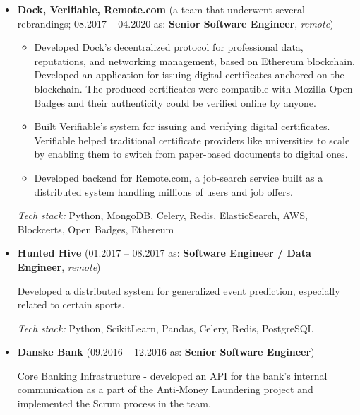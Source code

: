 \documentclass[12pt,a4paper]{article}
\begin{document}
\begin{itemize}[left=0pt]
  Developed a Spark-based company ETL system, provided technical mentorship, implemented best coding practices related to Python projects, co-implemented agile methodologies in the team.

  \textit{Tech stack:} Python, Apache Spark, Microsoft Azure, SQL Server.

  \item \textbf{Dock, Verifiable, Remote.com} (a team that underwent several rebrandings; 08.2017 -- 04.2020 as: \textbf{Senior Software Engineer}, \textit{remote})

  \begin{itemize}
    \item Developed Dock's decentralized protocol for professional data, reputations, and networking management, based on Ethereum blockchain. Developed an application for issuing digital certificates anchored on the blockchain. The produced certificates were compatible with Mozilla Open Badges and their authenticity could be verified online by anyone.

    \item Built Verifiable's system for issuing and verifying digital certificates. Verifiable helped traditional certificate providers like universities to scale by enabling them to switch from paper-based documents to digital ones.

    \item Developed backend for Remote.com, a job-search service built as a distributed system handling millions of users and job offers.
  \end{itemize}

  \textit{Tech stack:} Python, MongoDB, Celery, Redis, ElasticSearch, AWS, Blockcerts, Open Badges, Ethereum

  \item \textbf{Hunted Hive} (01.2017 -- 08.2017 as: \textbf{Software Engineer / Data Engineer}, \textit{remote})

  Developed a distributed system for generalized event prediction, especially related to certain sports.

  \textit{Tech stack:} Python, ScikitLearn, Pandas, Celery, Redis, PostgreSQL

  \item \textbf{Danske Bank} (09.2016 -- 12.2016 as: \textbf{Senior Software Engineer})

  Core Banking Infrastructure - developed an API for the bank's internal communication as a part of the Anti-Money Laundering project and implemented the Scrum process in the team.


\end{itemize}
\end{document}
